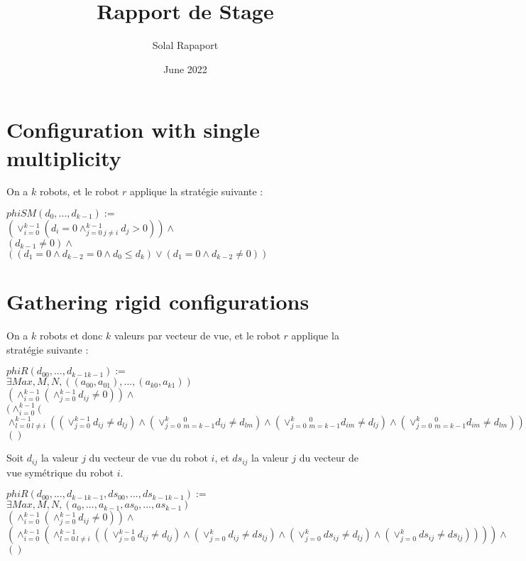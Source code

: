 \documentclass{article}
\title{Rapport de Stage}
\author{Solal Rapaport }
\date{June 2022}
\begin{document}
\maketitle

\section{Configuration with single multiplicity}

On a $k$ robots, et le robot $r$ applique la stratégie suivante :
\begin{center}
$phiSM(d_0, ..., d_{k-1}):=$\\
$(\lor_{i=0}^{k-1}(d_i = 0\land_{j=0\ j\not=i}^{k-1} d_j > 0))\land$\\
$(d_{k-1} \not= 0) \land $\\
$((d_1 = 0 \land d_{k-2} = 0 \land d_0 \leq d_k) \lor (d_1 = 0 \land d_{k-2} \not= 0))$
\end{center}

\section{Gathering rigid configurations}

On a $k$ robots et donc $k$ valeurs par vecteur de vue, et le robot $r$ applique la stratégie suivante :
\begin{center}
$phiR(d_{00}, ...,d_{k-1k-1}):=$\\
$\exists Max, M, N, ((a_{00}, a_{01}), ..., (a_{k0}, a_{k1}))$\\
$(\land_{i=0}^{k-1}(\land_{j=0}^{k-1}d_{ij}\not=0))\land $\\
$( \land_{i=0}^{k-1}($
$\land_{l=0\ l\not=i}^{k-1}(
(\lor_{j=0}^{k-1}d_{ij} \not= d_{lj})
\land (\lor_{j=0}^{k}_{m=k-1}^{0}d_{ij} \not= d_{lm})
\land (\lor_{j=0}^{k}_{m=k-1}^{0}d_{im} \not= d_{lj})
\land (\lor_{j=0}^{k}_{m=k-1}^{0}d_{im} \not= d_{lm}) 
) ))\land$\\
$()$
\end{center}

Soit $d_{ij}$ la valeur $j$ du vecteur de vue du robot $i$, et $ds_{ij}$ la valeur $j$ du vecteur de vue symétrique du robot $i$.

\begin{center}
$phiR(d_{00}, ...,d_{k-1k-1},ds_{00}, ...,ds_{k-1k-1}):=$\\
$\exists Max, M, N, (a_{0}, ..., a_{k-1}, as_{0}, ..., as_{k-1})$\\
$(\land_{i=0}^{k-1}(\land_{j=0}^{k-1}d_{ij}\not=0))\land $\\%
$( \land_{i=0}^{k-1}(
\land_{l=0\ l\not=i}^{k-1}(
(\lor_{j=0}^{k-1}d_{ij} \not= d_{lj})
\land (\lor_{j=0}^{k}d_{ij} \not= ds_{lj})
\land (\lor_{j=0}^{k}ds_{ij} \not= d_{lj})
\land (\lor_{j=0}^{k}ds_{ij} \not= ds_{lj}) 
) ))\land$\\
$()$
\end{center}
\end{document}

